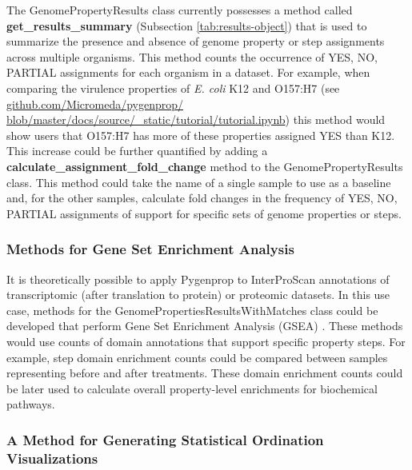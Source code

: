 The GenomePropertyResults class currently possesses a method called \textbf{get\_results\_summary} (Subsection \ref{tab:results-object}) that is used to summarize the presence and absence of genome property or step assignments across multiple organisms. This method counts the occurrence of YES, NO, PARTIAL assignments for each organism in a dataset. For example, when comparing the virulence properties of \textit{E. coli} K12 and O157:H7 (see \href{github.com/Micromeda/pygenprop/blob/master/docs/source/\_static/tutorial/tutorial.ipynb}{github.com/Micromeda/pygenprop/ \\blob/master/docs/source/\_static/tutorial/tutorial.ipynb}) this method would show users that O157:H7 has more of these properties assigned YES than K12. This increase could be further quantified by adding a \textbf{calculate\_assignment\_fold\_change} method to the GenomePropertyResults class. This method could take the name of a single sample to use as a baseline and, for the other samples, calculate fold changes in the frequency of YES, NO, PARTIAL assignments of support for specific sets of genome properties or steps.

\subsubsection{Methods for Gene Set Enrichment Analysis}

It is theoretically possible to apply Pygenprop to InterProScan annotations of transcriptomic \cite{wang2009rna} (after translation to protein) or proteomic \cite{phizicky2003protein} datasets. In this use case, methods for the GenomePropertiesResultsWithMatches class could be developed that perform Gene Set Enrichment Analysis (GSEA) \cite{subramanian2005gene}. These methods would use counts of domain annotations that support specific property steps. For example, step domain enrichment counts could be compared between samples representing before and after treatments. These domain enrichment counts could be later used to calculate overall property-level enrichments for biochemical pathways.

\subsubsection{A Method for Generating Statistical Ordination Visualizations}

